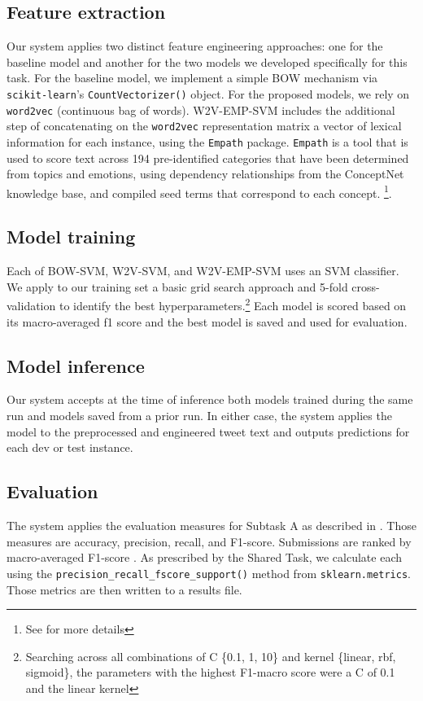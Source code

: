 \documentclass[11pt,a4paper]{article}
\begin{document}
\subsection{Feature extraction}
Our system applies two distinct feature engineering approaches: one for the baseline model and another for the two models we developed specifically for this task. For the baseline model, we implement a simple BOW mechanism via \verb|scikit-learn|’s \verb|CountVectorizer()| object. For the proposed models, we rely on \verb|word2vec| (continuous bag of words). W2V-EMP-SVM includes the additional step of concatenating on the \verb|word2vec| representation matrix a vector of lexical information for each instance, using the \verb|Empath| package. \verb|Empath| is a tool that is used to score text across 194 pre-identified categories that have been determined from topics and emotions, using dependency relationships from the ConceptNet knowledge base, and compiled seed terms that correspond to each concept. \footnote{See \citet{fast2016empath} for more details}. 


\subsection{Model training}
Each of BOW-SVM, W2V-SVM, and W2V-EMP-SVM uses an SVM classifier. We apply to our training set a basic grid search approach and 5-fold cross-validation to identify the best hyperparameters.\footnote{Searching across all combinations of C \{0.1, 1, 10\} and kernel \{linear, rbf, sigmoid\}, the parameters with the highest F1-macro score were a C of 0.1 and the linear kernel} Each model is scored based on its macro-averaged f1 score and the best model is saved and used for evaluation.


\subsection{Model inference}
Our system accepts at the time of inference both models trained during the same run and models saved from a prior run. In either case, the system applies the model to the preprocessed and engineered tweet text and outputs predictions for each dev or test instance.


\subsection{Evaluation}
The system applies the evaluation measures for Subtask A as described in \citet{basile-etal-2019-semeval}. Those measures are accuracy, precision, recall, and F1-score. Submissions are ranked by macro-averaged F1-score \citep{basile-etal-2019-semeval}. As prescribed by the Shared Task, we calculate each using the \verb|precision_recall_fscore_support()| method from \verb|sklearn.metrics|. Those metrics are then written to a results file.
\end{document}

